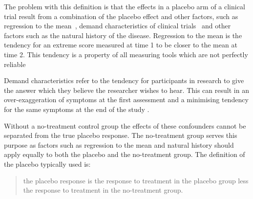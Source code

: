 The problem with this definition is that the effects in a placebo arm of a clinical trial result from a combination of the placebo effect and other factors, such as regression to the mean~\cite{Morton2003}, demand characteristics of clinical trials~\cite{hrobjartsson2001,weber1972subject} and other factors such as the natural history of the disease. Regression to the mean is the tendency for an extreme score measured at time 1 to be closer to the mean at time 2. This tendency is a property of all measuring tools which are not perfectly reliable \cite{Morton2003}

Demand characteristics \cite{Fernandez1994,weber1972subject} refer to the tendency for participants in research to give the answer which they believe the researcher wishes to hear. This can result in an over-exaggeration of symptoms at the first assessment and a minimising tendency for the same symptoms at the end of the study \cite{Vase2005}.  






Without a no-treatment control group the effects of these confounders cannot be separated from the true placebo response.  The no-treatment group serves this purpose as factors such as regression to the mean and natural history should apply equally to both the placebo and the no-treatment group.  The definition of the placebo typically used is:
\begin{quotation}
 the placebo response is the response to treatment in the placebo group less the response to treatment in the no-treatment group.  
\end{quotation}

